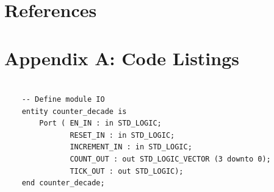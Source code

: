 \documentclass[11pt]{article}
\newenvironment{code}{\captionsetup{type=listing}}{}
\begin{document}
%
%
%
\newpage

\section{References}
\printbibliography

\newpage

\section{Appendix A: Code Listings}

\begin{code}
	\begin{verbatim}
  
    -- Define module IO
    entity counter_decade is
        Port ( EN_IN : in STD_LOGIC;
               RESET_IN : in STD_LOGIC;
               INCREMENT_IN : in STD_LOGIC;
               COUNT_OUT : out STD_LOGIC_VECTOR (3 downto 0);
               TICK_OUT : out STD_LOGIC);
    end counter_decade;

  \end{verbatim}
	\captionsetup{belowskip=0pt}
	\label{code:entity_naming_convention}
\end{code}
\end{document}
